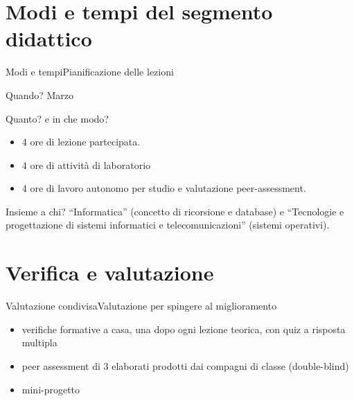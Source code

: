 \documentclass[italian]{beamer}
\begin{document}
\section[Modi e tempi]{Modi e tempi del segmento didattico}
\begin{frame}{Modi e tempi}{Pianificazione delle lezioni}
	
	\begin{block}{Quando?}
	Marzo
	\end{block}
	
	\begin{block}{Quanto? e in che modo?}
	\begin{itemize}
		\item 4 ore di lezione partecipata.
		\item 4 ore di attivit\`a di laboratorio
		\item 4 ore di lavoro autonomo per studio e valutazione peer-assessment.
	\end{itemize}
	\end{block}

	\begin{block}{Insieme a chi?}
		``Informatica'' (concetto di ricorsione e database) e ``Tecnologie e progettazione di sistemi informatici e telecomunicazioni'' (sistemi operativi).
	\end{block}
\end{frame}


\section[Verifica e valutazione]{Verifica e valutazione}
\begin{frame}{Valutazione condivisa}{Valutazione per spingere al miglioramento}
	
	\begin{itemize}
		\item verifiche formative a casa, una dopo ogni lezione teorica, con quiz a risposta multipla
		\item peer assessment di 3 elaborati prodotti dai compagni di classe (double-blind)
		\item mini-progetto
	\end{itemize}
	
	\note{%
		
	}%
\end{frame}
\end{document}
